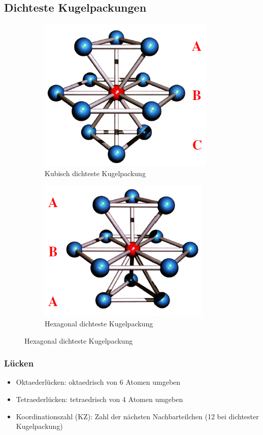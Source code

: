 \subsection{Dichteste Kugelpackungen}
\begin{figure}[htbp]
	\begin{subfigure}{0.49\linewidth}
		\centering
		\includegraphics[width=0.49\linewidth]{images/1_kubisch_dichteste_KuPa.png}
		\caption{Kubisch dichteste Kugelpackung}
	\end{subfigure}
	\begin{subfigure}{0.49\linewidth}
		\centering
		\includegraphics[width=0.49\linewidth]{images/1_hexagonal_dichteste_KuPa.png}
		\caption{Hexagonal dichteste Kugelpackung}
	\end{subfigure}
\end{figure}

\subsubsection{Lücken}
\begin{itemize}
	\item Oktaederlücken: oktaedrisch von 6 Atomen umgeben
	\item Tetraederlücken: tetraedrisch von 4 Atomen umgeben
	\item Koordinationszahl (KZ): Zahl der nächsten Nachbarteilchen (12 bei  dichtester Kugelpackung)
\end{itemize}

